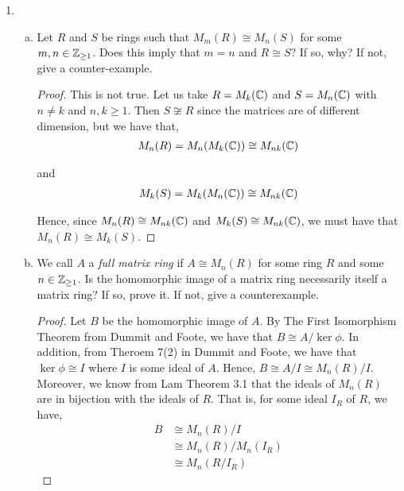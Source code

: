 \documentclass[11pt, reqno]{amsart}
\theoremstyle{plain}
\theoremstyle{definition}
\theoremstyle{example}
\begin{document}
\begin{enumerate}[1.]
\begin{proof}
Now we will show the equivalent of (iii) and (iv). Suppose $M$ is semisimple and Artinian. Then the sequence of submodules of $M$
\begin{align*}
M_1 \supset M_2 \supset \ldots
\end{align*}
stabilizes. That is, there exists an integer $N$ such that if $n \geq N$ then $M_n = M_{n+1}$. Since no simple module can have a submodule, then $M_N$ is the only simple module in this chain. Observe that since $M$ is semisimple, it must be the direct sum of simple submodules. There must be only finitely many of these simple submodules (why?), so $M$ is a finite direct sum of simple modules. Now let us assume that $M$ is semisimple and a finite direct sum of simple modules and work in reverse.
\end{proof}

\item 
\begin{enumerate}[(a)]
\item Let $R$ and $S$ be rings such that $M_m(R) \cong M_n(S)$ for some $m, n \in \mathbb{Z}_{\ge 1}$. Does this imply that $m = n$ and $R \cong S$? If so, why? If not, give a counter-example. 

\begin{proof}
This is not true. Let us take $R = M_k(\mathbb{C})$ and $S = M_n(\mathbb{C})$ with $n \neq k$ and $n, k \geq 1$. Then $S \not\cong R$ since the matrices are of different dimension, but we have that,
\begin{align*}
M_n(R) = M_n(M_k(\mathbb{C})) \cong M_{nk}(\mathbb{C})
\end{align*}

and
\begin{align*}
M_k(S) = M_k(M_n(\mathbb{C})) \cong M_{nk}(\mathbb{C})
\end{align*}

Hence, since $M_n(R) \cong M_{nk}(\mathbb{C})$ and $M_k(S) \cong M_{nk}(\mathbb{C})$, we must have that $M_n(R) \cong M_k(S)$.
\end{proof}

\item We call $A$ a \emph{full matrix ring} if $A \cong M_n(R)$ for some ring $R$ and some $n \in \mathbb{Z}_{\ge 1}$. Is the homomorphic image of a matrix ring necessarily itself a matrix ring? If so, prove it. If not, give a counterexample.  

\begin{proof}
Let $B$ be the homomorphic image of $A$. By The First Isomorphism Theorem from Dummit and Foote, we have that $B \cong A/\ker \phi$. In addition, from Theroem 7(2) in Dummit and Foote, we have that $\ker \phi \cong I$ where $I$ is some ideal of $A$. Hence, $B \cong A/I \cong M_n(R)/I$. Moreover, we know from Lam Theorem 3.1 that the ideals of $M_n(R)$ are in bijection with the ideals of $R$. That is, for some ideal $I_R$ of $R$, we have,
\begin{align*}
B &\cong M_n(R)/I\\
&\cong M_n(R)/M_n(I_R)\\
&\cong M_n(R/I_R)
\end{align*}


\end{proof}
\end{enumerate}
\end{enumerate}
\end{document}
